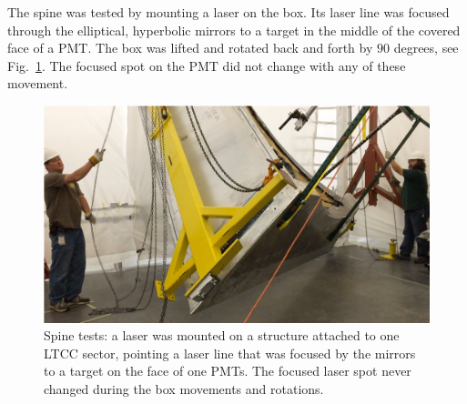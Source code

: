 The spine was tested by mounting a laser on the box. Its laser line was focused through the elliptical, hyperbolic mirrors to a target in the middle of the covered face of a PMT.
The box was lifted and rotated back and forth by $90$ degrees, see Fig.~\ref{fig:spineTest}. The focused spot on the PMT did not change with any of these movement.

\begin{figure}[h]
	\centering
	\includegraphics[width=1.0\columnwidth,keepaspectratio]{img/spineTest.png}
	\caption{Spine tests: a laser was mounted on a structure attached to one LTCC sector, pointing a laser line that was focused by the mirrors to a target on the face of one PMTs. The focused laser
            spot never changed during the box movements and rotations.}
	\label{fig:spineTest}
\end{figure}





